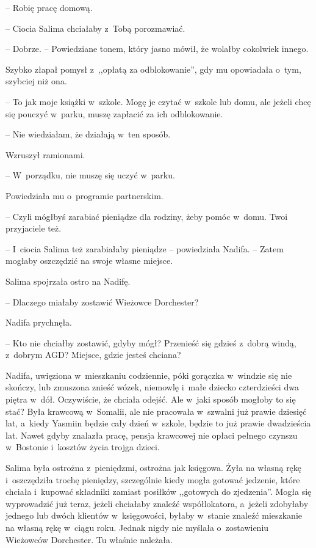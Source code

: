 \documentclass[oneside,polish,11pt,sfheadings]{mwbk}
\begin{document}
-- Robię pracę domową.

-- Ciocia Salima chciałaby z~Tobą porozmawiać.

-- Dobrze. -- Powiedziane tonem, który jasno mówił, że wolałby cokolwiek
innego.

Szybko złapał pomysł z~,,opłatą za odblokowanie'', gdy mu opowiadała o~tym, szybciej niż ona. 

-- To jak moje książki w~szkole. Mogę je czytać w~szkole lub domu, ale jeżeli chcę się pouczyć w~parku, muszę zapłacić za
ich odblokowanie.

-- Nie wiedziałam, że działają w~ten sposób.

Wzruszył ramionami. 

-- W~porządku, nie muszę się uczyć w~parku.

Powiedziała mu o~programie partnerskim. 

-- Czyli mógłbyś zarabiać
pieniądze dla rodziny, żeby pomóc w~domu. Twoi przyjaciele też.

-- I~ciocia Salima też zarabiałaby pieniądze -- powiedziała Nadifa. -- Zatem mogłaby oszczędzić na swoje własne miejsce.

Salima spojrzała ostro na Nadifę. 

-- Dlaczego miałaby zostawić Wieżowce
Dorchester?

Nadifa prychnęła. 

-- Kto nie chciałby zostawić, gdyby mógł? Przenieść się
gdzieś z~dobrą windą, z~dobrym AGD? Miejsce, gdzie jesteś chciana?

Nadifa, uwięziona w~mieszkaniu codziennie, póki gorączka w~windzie się
nie skończy, lub zmuszona znieść wózek, niemowlę i~małe dziecko
czterdzieści dwa piętra w~dół. Oczywiście, że chciała odejść. Ale w~jaki
sposób mogłoby to się stać? Była krawcową w~Somalii, ale nie pracowała w~szwalni już prawie dziesięć lat, a~kiedy Yasmiin będzie cały dzień w~szkole, będzie to już prawie dwadzieścia lat. Nawet gdyby znalazła
pracę, pensja krawcowej nie opłaci pełnego czynszu w~Bostonie i~kosztów
życia trojga dzieci.

Salima była ostrożna z~pieniędzmi, ostrożna jak księgowa. Żyła na własną
rękę i~oszczędziła trochę pieniędzy, szczególnie kiedy mogła gotować
jedzenie, które chciała i~kupować składniki zamiast posiłków ,,gotowych
do zjedzenia''. Mogła się wyprowadzić już teraz, jeżeli chciałaby
znaleźć współlokatora, a~jeżeli zdobyłaby jednego lub dwóch klientów w~księgowości, byłaby w~stanie znaleźć mieszkanie na własną rękę w~ciągu
roku. Jednak nigdy nie myślała o~zostawieniu Wieżowców Dorchester. Tu
właśnie należała.
\end{document}
